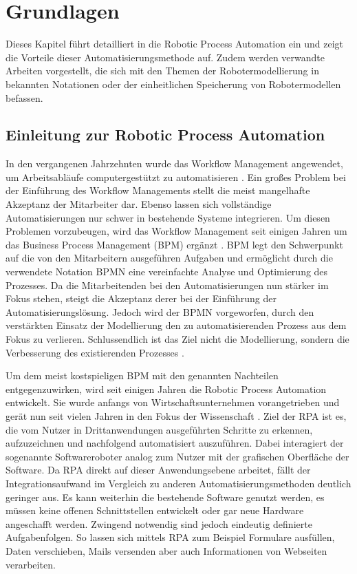 \section{Grundlagen}

Dieses Kapitel führt detailliert in die Robotic Process Automation ein und zeigt die Vorteile dieser Automatisierungsmethode auf. Zudem werden verwandte Arbeiten vorgestellt, die sich mit den Themen der Robotermodellierung in bekannten Notationen oder der einheitlichen Speicherung von Robotermodellen befassen.

\subsection{Einleitung zur Robotic Process Automation}


In den vergangenen Jahrzehnten wurde das Workflow Management angewendet, um Arbeitsabläufe computergestützt zu automatisieren \cite{Aalst2004}. Ein großes Problem bei der Einführung des Workflow Managements stellt die meist mangelhafte Akzeptanz der Mitarbeiter dar. Ebenso lassen sich vollständige Automatisierungen nur schwer in bestehende Systeme integrieren. Um diesen Problemen vorzubeugen, wird das Workflow Management seit einigen Jahren um das Business Process Management (BPM) ergänzt \cite{Aalst2021}. BPM legt den Schwerpunkt auf die von den Mitarbeitern ausgeführen Aufgaben und ermöglicht durch die verwendete Notation BPMN eine vereinfachte Analyse und Optimierung des Prozesses. Da die Mitarbeitenden bei den Automatisierungen nun stärker im Fokus stehen, steigt die Akzeptanz derer bei der Einführung der Automatisierungslösung. Jedoch wird der BPMN vorgeworfen, durch den verstärkten Einsatz der Modellierung den zu automatisierenden Prozess aus dem Fokus zu verlieren. \glqq Schlussendlich ist das Ziel nicht die Modellierung, sondern die Verbesserung des existierenden Prozesses\grqq{} \cite{Aalst2004}.

Um dem meist kostspieligen BPM mit den genannten Nachteilen entgegenzuwirken, wird seit einigen Jahren die Robotic Process Automation entwickelt. Sie wurde anfangs von Wirtschaftsunternehmen vorangetrieben und gerät nun seit vielen Jahren in den Fokus der Wissenschaft \cite{AalstProcessMining}. Ziel der RPA ist es, die vom Nutzer in Drittanwendungen ausgeführten Schritte zu erkennen, aufzuzeichnen und nachfolgend automatisiert auszuführen. Dabei interagiert der sogenannte Softwareroboter analog zum Nutzer mit der grafischen Oberfläche der Software. Da RPA direkt auf dieser Anwendungsebene arbeitet, fällt der Integrationsaufwand im Vergleich zu anderen Automatisierungsmethoden deutlich geringer aus. Es kann weiterhin die bestehende Software genutzt werden, es müssen keine offenen Schnittstellen entwickelt oder gar neue Hardware angeschafft werden. Zwingend notwendig sind jedoch eindeutig definierte Aufgabenfolgen. So lassen sich mittels RPA zum Beispiel Formulare ausfüllen, Daten verschieben, Mails versenden aber auch Informationen von Webseiten verarbeiten. 

